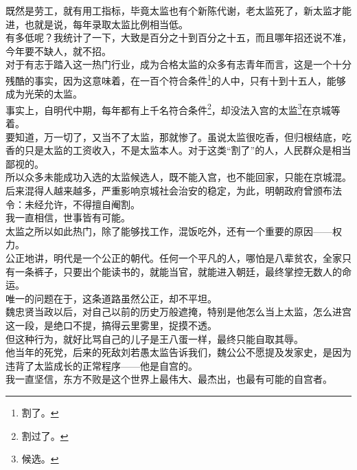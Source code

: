\begin{multicols}{\theparacolNo}
既然是劳工，就有用工指标，毕竟太监也有个新陈代谢，老太监死了，新太监才能进，也就是说，每年录取太监比例相当低。\\

有多低呢？我统计了一下，大致是百分之十到百分之十五，而且哪年招还说不准，今年要不缺人，就不招。\\

对于有志于踏入这一热门行业，成为合格太监的众多有志青年而言，这是一个十分残酷的事实，因为这意味着，在一百个符合条件\footnote{割了。}的人中，只有十到十五人，能够成为光荣的太监。\\

事实上，自明代中期，每年都有上千名符合条件\footnote{割过了。}，却没法入宫的太监\footnote{候选。}在京城等着。\\

要知道，万一切了，又当不了太监，那就惨了。虽说太监很吃香，但归根结底，吃香的只是太监的工资收入，不是太监本人。对于这类“割了”的人，人民群众是相当鄙视的。\\

所以众多未能成功入选的太监候选人，既不能入宫，也不能回家，只能在京城混。后来混得人越来越多，严重影响京城社会治安的稳定，为此，明朝政府曾颁布法令：未经允许，不得擅自阉割。\\

我一直相信，世事皆有可能。\\

太监之所以如此热门，除了能够找工作，混饭吃外，还有一个重要的原因——权力。\\

公正地讲，明代是一个公正的朝代。任何一个平凡的人，哪怕是八辈贫农，全家只有一条裤子，只要出个能读书的，就能当官，就能进入朝廷，最终掌控无数人的命运。\\

唯一的问题在于，这条道路虽然公正，却不平坦。\\

魏忠贤当政以后，对自己以前的历史万般遮掩，特别是他怎么当上太监，怎么进宫这一段，是绝口不提，搞得云里雾里，捉摸不透。\\

但这种行为，就好比骂自己的儿子是王八蛋一样，最终只能自取其辱。\\

他当年的死党，后来的死敌刘若愚太监告诉我们，魏公公不愿提及发家史，是因为违背了太监成长的正常程序——他是自宫的。\\

我一直坚信，东方不败是这个世界上最伟大、最杰出，也最有可能的自宫者。\\


\end{multicols}

